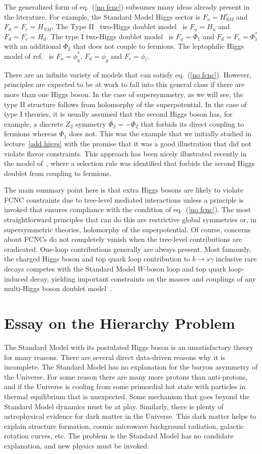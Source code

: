 \documentclass[12pt]{article}
\def\xsection#1{\section{#1}}
\def\eq#1{eq.~(\ref{#1})}
\begin{document}
The generalized form of \eq{no fcnc} subsumes many ideas already present in the literature. For example, the Standard Model Higgs sector is $F_u=H^c_{SM}$ and $F_d=F_e=H_{SM}$. The Type II~\cite{Higgs type models} two-Higgs doublet model~\cite{HHG} is $F_u=H_u$ and $F_d=F_e=H_d$. The type I two-Higgs doublet model~\cite{HHG} is $F_u=\Phi_1$ and $F_d=F_e=\Phi^*_1$ with an additional $\Phi_2$ that does not couple to fermions. The leptophilic Higgs model of ref.~\cite{Su:2009fz} is $F_u=\phi^*_q$, $F_d=\phi_q$ and $F_e=\phi_l$. 

There are an infinite variety of models that can satisfy \eq{no fcnc}. However, principles are expected to be at work to fall into this general class if there are more than one Higgs boson. In the case of supersymmetry, as we will see, the type II structure follows from holomorphy of the superpotential. In the case of type I theories, it is usually assumed that the second Higgs boson has, for example,  a discrete $Z_2$ symmetry $\Phi_2=-\Phi_2$ that forbids its direct coupling to fermions whereas $\Phi_1$ does not. This was the example that we initially studied in lecture~\ref{add higgs} with the promise that it was a good illustration that did not violate flavor constraints. This approach has been nicely illustrated recently in the model of~\cite{Ambroso:2008kb}, where a selection rule was identified that forbids the second Higgs doublet from coupling to fermions.  

The main summary point here is that  extra  Higgs bosons are likely to violate FCNC constraints due to tree-level mediated interactions unless a principle is invoked that ensures compliance with the condition of \eq{no fcnc}. The most straightforward principles that can do this are restrictive global symmetries or, in supersymmetric theories, holomorphy of the superpotential. Of course, concerns about FCNCs do not completely vanish when the tree-level contributions are eradicated. One-loop contributions generally are always present. Most famously, the charged Higgs boson and top quark loop contribution to $b\to s\gamma$ inclusive rare decays competes with the Standard Model $W$-boson loop and top quark loop-induced decay, yielding important constraints on the masses and couplings of any multi-Higgs boson doublet model~\cite{Misiak:2006zs}.

\xsection{Essay on the Hierarchy Problem\label{sec:hierarchy}}

The Standard Model with its postulated Higgs boson is an unsatisfactory theory for many reasons. There are several direct data-driven reasons why it is incomplete. The Standard Model has no explanation for the baryon asymmetry of the Universe. For some reason there are many more protons than anti-protons, and if the Universe is cooling from some primordial hot state with particles in thermal equilibrium that is unexpected. Some mechanism that goes beyond the Standard Model dynamics must be at play. Similarly, there is plenty of astrophysical evidence for dark matter in the Universe. This dark matter helps to explain structure formation, cosmic microwave background radiation, galactic rotation curves, etc. The problem is the Standard Model has no candidate explanation, and new physics must be invoked.  
\end{document}
